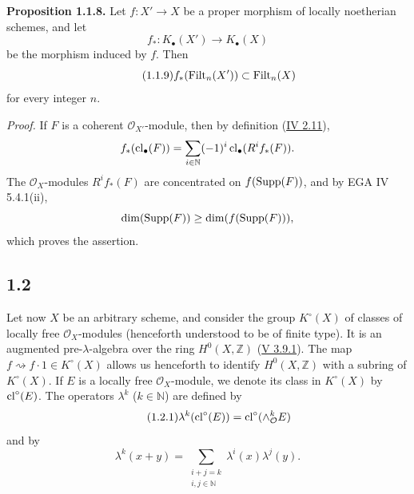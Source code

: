 \textbf{Proposition 1.1.8.}
Let $f:X'\to X$ be a proper morphism of locally noetherian schemes, and let
\[
f_*:K_\bullet(X')\longrightarrow K_\bullet(X)
\]
be the morphism induced by $f$. Then
\begin{equation}\tag{1.1.9}
f_*(\operatorname{Filt}_n(X'))\subset\operatorname{Filt}_n(X)
\end{equation}
for every integer $n$.

\emph{Proof.}
If $F$ is a coherent $\mathcal O_{X'}$-module, then by definition (\hyperlink{sga6.e04.para.2-11}{IV 2.11}),
\[
f_*(\operatorname{cl}_\bullet(F))=
\sum_{i\in\mathbb N}(-1)^i\operatorname{cl}_\bullet(R^if_*(F)).
\]
The $\mathcal O_X$-modules $R^if_*(F)$ are concentrated on
$f(\operatorname{Supp}(F))$, and by EGA IV 5.4.1(ii),
\[
\dim(\operatorname{Supp}(F))\geq\dim(f(\operatorname{Supp}(F))),
\]
which proves the assertion.

\subsection*{1.2}
Let now $X$ be an arbitrary scheme, and consider the group $K^\circ(X)$ of
classes of locally free $\mathcal O_X$-modules (henceforth understood to be of
finite type). It is an augmented pre-$\lambda$-algebra over the ring
$H^0(X,\mathbb Z)$ (\hyperlink{sga6.e05.ex.3-9-1}{V 3.9.1}). The map
$f\rightsquigarrow f\cdot1\in K^\circ(X)$ allows us henceforth to identify
$H^0(X,\mathbb Z)$ with a subring of $K^\circ(X)$. If $E$ is a locally free
$\mathcal O_X$-module, we denote its class in $K^\circ(X)$ by
$\operatorname{cl}^\circ(E)$. The operators $\lambda^k$ ($k\in\mathbb N$) are defined by
\begin{equation}\tag{1.2.1}
\lambda^k(\operatorname{cl}^\circ(E))=\operatorname{cl}^\circ(\wedge_{\mathcal O}^kE)
\end{equation}
and by
\begin{equation}\tag{1.2.2}
\lambda^k(x+y)=
\sum_{\substack{i+j=k\\ i,j\in\mathbb N}}\lambda^i(x)\lambda^j(y).
\end{equation}

